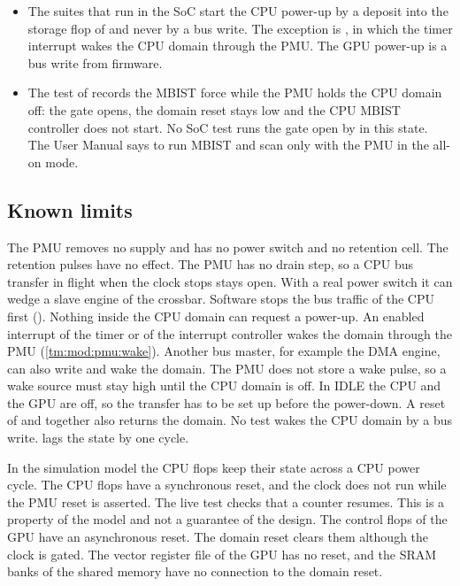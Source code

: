 \begin{itemize}
  \item The suites that run in the SoC start the CPU power-up by a deposit into the storage flop of  and never by a bus write. The exception is , in which the timer interrupt wakes the CPU domain through the PMU. The GPU power-up is a bus write from firmware.
  \item The test  of  records the MBIST force while the PMU holds the CPU domain off: the gate opens, the domain reset stays low and the CPU MBIST controller does not start. No SoC test runs the gate open by  in this state. The User Manual says to run MBIST and scan only with the PMU in the all-on mode.
\end{itemize}

\subsection{Known limits}
The PMU removes no supply and has no power switch and no retention cell. The retention pulses have no effect. The PMU has no drain step, so a CPU bus transfer in flight when the clock stops stays open. With a real power switch it can wedge a slave engine of the crossbar. Software stops the bus traffic of the CPU first (). Nothing inside the CPU domain can request a power-up. An enabled interrupt of the timer or of the interrupt controller wakes the domain through the PMU (\cref{tm:mod:pmu:wake}). Another bus master, for example the DMA engine, can also write  and wake the domain. The PMU does not store a wake pulse, so a wake source must stay high until the CPU domain is off. In IDLE the CPU and the GPU are off, so the transfer has to be set up before the power-down. A reset of  and  together also returns the domain. No test wakes the CPU domain by a bus write.  lags the state by one cycle.

In the simulation model the CPU flops keep their state across a CPU power cycle. The CPU flops have a synchronous reset, and the clock does not run while the PMU reset is asserted. The live test checks that a counter resumes. This is a property of the model and not a guarantee of the design. The control flops of the GPU have an asynchronous reset. The domain reset clears them although the clock is gated. The vector register file of the GPU has no reset, and the SRAM banks of the shared memory have no connection to the domain reset.

